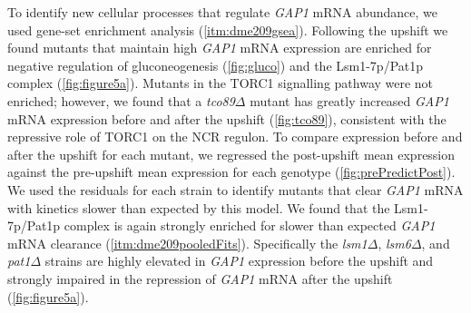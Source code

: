 {



To identify new cellular processes that regulate \textit{GAP1} mRNA abundance, we
used gene-set enrichment analysis (\autoref{itm:dme209gsea}).
Following the upshift we found mutants that
maintain high \textit{GAP1} mRNA expression are enriched for negative
regulation of gluconeogenesis (\autoref{fig:gluco}) and the
Lsm1-7p/Pat1p complex (\autoref{fig:figure5a}). Mutants in the TORC1 signalling
pathway were not enriched; 
however, we found that a \textit{tco89}$\Delta$ mutant has
greatly increased \textit{GAP1} mRNA expression before and after the upshift
(\autoref{fig:tco89}), consistent with the repressive role of TORC1
on the NCR regulon.
To compare expression before and after the upshift for each mutant,
we regressed the post-upshift mean expression against the pre-upshift 
mean expression for each genotype (\autoref{fig:prePredictPost}). 
We used the residuals for each
strain to identify mutants that clear \textit{GAP1} mRNA with kinetics slower
than expected by this model.
We found that the Lsm1-7p/Pat1p complex is again strongly 
enriched for slower than
expected \textit{GAP1} mRNA clearance (\autoref{itm:dme209pooledFits}). 
Specifically
the \textit{lsm1}$\Delta$, \textit{lsm6}$\Delta$, and 
\textit{pat1}$\Delta$ strains are highly elevated in \textit{GAP1}
expression before the upshift and strongly impaired in the 
repression of \textit{GAP1} mRNA after the upshift
(\autoref{fig:figure5a}). 

}
